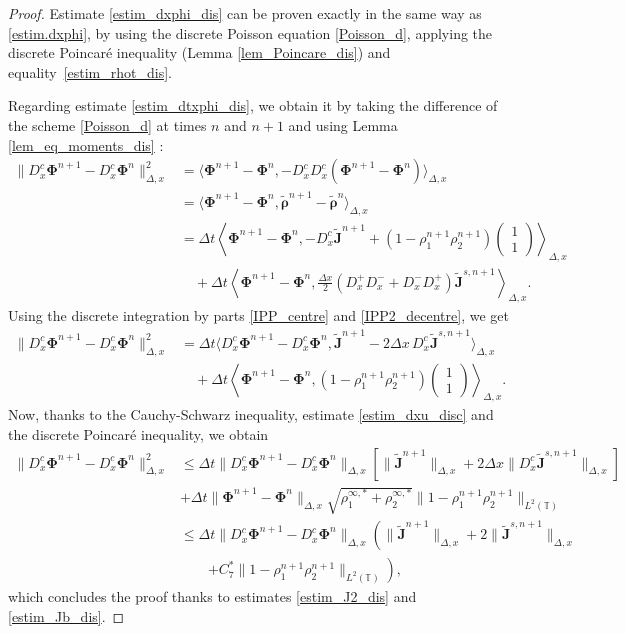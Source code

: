 \documentclass[reqno]{amsart}
\newcommand{\Dt}{\Delta t}
\newcommand{\Dx}{\Delta x}
\newcommand{\T}{\mathbb{T}}
\newcommand{\rhot}{\widetilde{\rho}}
\newcommand{\Jt}{\widetilde{J}}
\newcommand{\Phibf}{\boldsymbol{\Phi}}
\newcommand{\rhotbf}{\boldsymbol{\rhot}}
\newcommand{\Jtbf}{\mathbf{\Jt}}
\numberwithin{equation}{section}
\begin{document}
\begin{proof}
    Estimate \eqref{estim_dxphi_dis} can be proven exactly in the same way as \eqref{estim.dxphi}, by using the discrete Poisson equation \eqref{Poisson_d}, applying the discrete Poincaré inequality (Lemma \ref{lem_Poincare_dis}) and equality~\eqref{estim_rhot_dis}.
    
    Regarding estimate \eqref{estim_dtxphi_dis}, we obtain it by taking the difference of the scheme \eqref{Poisson_d} at times $n$ and $n+1$ and using Lemma \ref{lem_eq_moments_dis} :
    \begin{align*}
        \| D_x^c\Phibf^{n+1}-D_x^c\Phibf^{n}\|_{\Delta, x}^2&=\langle \Phibf^{n+1}-\Phibf^n,-D_x^cD_x^c(\Phibf^{n+1}-\Phibf^n)\rangle_{\Delta,x}\\
        &= \langle\Phibf^{n+1}-\Phibf^n,\rhotbf^{n+1}-\rhotbf^n\rangle_{\Delta,x}\\
        &=\Dt\left\langle \Phibf^{n+1}-\Phibf^n, -D_x^c\Jtbf^{n+1}+(1-\rho_1^{n+1}\rho_2^{n+1})\begin{pmatrix} 1\\ 1 \end{pmatrix}\right\rangle_{\Delta,x}\\
        &\quad + \Dt\left\langle \Phibf^{n+1}-\Phibf^n , \frac{\Dx}{2}(D_x^+D_x^-+D_x^-D_x^+)\Jtbf^{s,n+1}\right\rangle_{\Delta,x}.
    \end{align*}
    Using the discrete integration by parts \eqref{IPP_centre} and \eqref{IPP2_decentre}, we get
    \begin{align*}
        \| D_x^c\Phibf^{n+1}-D_x^c\Phibf^{n}\|_{\Delta, x}^2&=\Dt \langle D_x^c\Phibf^{n+1}-D_x^c\Phibf^{n},\Jtbf^{n+1}-2\Dx\,D_x^c \Jtbf^{s,n+1} \rangle_{\Delta,x}\\
        &\quad + \Dt\left\langle \Phibf^{n+1}-\Phibf^n,(1-\rho_1^{n+1}\rho_2^{n+1})\begin{pmatrix} 1\\ 1 \end{pmatrix}\right\rangle_{\Delta,x}.
    \end{align*}
    Now, thanks to the Cauchy-Schwarz inequality, estimate \eqref{estim_dxu_disc} and the discrete Poincaré inequality, we obtain
    \begin{align*}
        \| D_x^c\Phibf^{n+1}-D_x^c\Phibf^{n}\|_{\Delta, x}^2 &\leq \Dt \|D_x^c\Phibf^{n+1}-D_x^c\Phibf^{n}\|_{\Delta,x}\left[ \|\Jtbf^{n+1}\|_{\Delta,x}+2\Dx \|D_x^c\Jtbf^{s,n+1}\|_{\Delta,x}\right]\\
        & +\Dt \|\Phibf^{n+1}-\Phibf^n\|_{\Delta,x}\sqrt{\rho_1^{\infty,*}+\rho_2^{\infty,*}}\|1-\rho_1^{n+1}\rho_2^{n+1}\|_{L^2(\T)}\\
        & \leq \Dt \|D_x^c\Phibf^{n+1}-D_x^c\Phibf^{n}\|_{\Delta,x}\left( \|\Jtbf^{n+1}\|_{\Delta,x}+2\|\Jtbf^{s,n+1}\|_{\Delta,x}\right.\\ &\qquad\left.+C_7^*\|1-\rho_1^{n+1}\rho_2^{n+1}\|_{L^2(\T)}\right),
    \end{align*}
    which concludes the proof thanks to estimates \eqref{estim_J2_dis} and \eqref{estim_Jb_dis}.
\end{proof}
\end{document}

